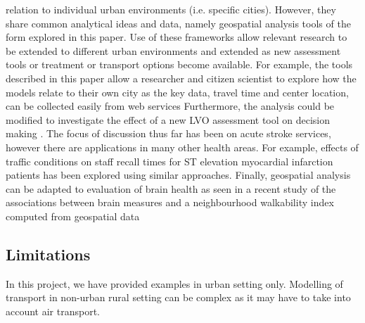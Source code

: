 \documentclass[utf8]{frontiersHLTH}
\begin{document}
relation to individual urban environments (i.e. specific
cities). However, they share common analytical ideas and data, namely
geospatial analysis tools of the form explored in this paper. Use of
these frameworks allow relevant research to be extended to different
urban environments and extended as new assessment tools or treatment
or transport options become available. For example, the tools
described in this paper allow a researcher and citizen scientist to
explore how the models relate to their own city as the key data,
travel time and center location, can be collected easily from web
services \cite{10.1001/jamaneurol.2018.2424,Milne_2017} Furthermore,
the analysis could be modified to investigate the effect of a new LVO
assessment tool on decision making
\cite{10.3389/fneur.2019.00130}. The focus of discussion thus far has
been on acute stroke services, however there are applications in many
other health areas. For example, effects of traffic conditions on
staff recall times for ST elevation myocardial infarction patients has
been explored using similar
approaches\cite{10.3389/fcvm.2017.00089}. Finally, geospatial analysis
can be adapted to evaluation of brain health as seen in a recent study
of the associations between brain measures and a neighbourhood
walkability index computed from geospatial data
\cite{cerin2017associations}

\subsection{Limitations} 
In this project, we have provided examples in urban setting
only. Modelling of transport in non-urban rural setting can be complex
as it may have to take into account air transport.
\end{document}
